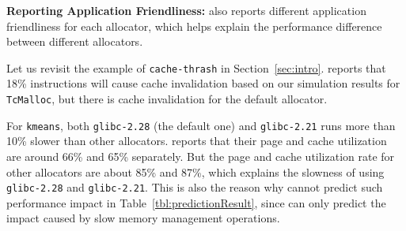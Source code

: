 
\textbf{Reporting Application Friendliness:} 
\MP{} also reports different application friendliness for each allocator, which helps explain the performance difference between different allocators. 

Let us revisit the example of \texttt{cache-thrash} in Section~\ref{sec:intro}. \MP{} reports that 18\% instructions will cause cache invalidation based on our simulation results for \texttt{TcMalloc}, but there is  cache invalidation for the default allocator. 


For \texttt{kmeans}, both \texttt{glibc-2.28} (the default one) and \texttt{glibc-2.21} runs more than  10\% slower than other allocators. \MP{} reports that their page and cache utilization are around 66\% and 65\% separately. But the page and cache utilization rate for other allocators are about 85\% and 87\%, which explains the slowness of using \texttt{glibc-2.28} and \texttt{glibc-2.21}. This is also the reason why \MP{} cannot predict such performance impact in Table~\ref{tbl:predictionResult}, since \MP{} can only predict the impact caused by slow memory management operations. 


